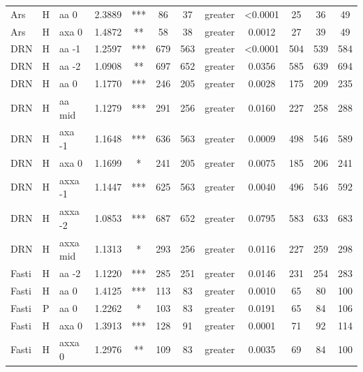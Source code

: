 \documentclass[twocolumn, switch]{article} %
\begin{document}
\begin{table}[h!]
\begin{adjustbox}{totalheight=0.9\textheight}
\begin{tabular}{lclcccclcc@{\hspace{1\tabcolsep}}c@{\hspace{1\tabcolsep}}c}
           Ars &     H &      aa 0 & 2.3889 &     *** &    86 &    37 &  greater &  <0.0001 &       25 &       36 &       49 \\
           Ars &     H &     axa 0 & 1.4872 &      ** &    58 &    38 &  greater &  0.0012 &       27 &       39 &       49 \\
           DRN &     H &     aa -1 & 1.2597 &     *** &   679 &   563 &  greater &  <0.0001 &      504 &      539 &      584 \\
           DRN &     H &     aa -2 & 1.0908 &      ** &   697 &   652 &  greater &  0.0356 &      585 &      639 &      694 \\
           DRN &     H &      aa 0 & 1.1770 &     *** &   246 &   205 &  greater &  0.0028 &      175 &      209 &      235 \\
           DRN &     H &    aa mid & 1.1279 &     *** &   291 &   256 &  greater &  0.0160 &      227 &      258 &      288 \\
           DRN &     H &    axa -1 & 1.1648 &     *** &   636 &   563 &  greater &  0.0009 &      498 &      546 &      589 \\
           DRN &     H &     axa 0 & 1.1699 &       * &   241 &   205 &  greater &  0.0075 &      185 &      206 &      241 \\
           DRN &     H &   axxa -1 & 1.1447 &     *** &   625 &   563 &  greater &  0.0040 &      496 &      546 &      592 \\
           DRN &     H &   axxa -2 & 1.0853 &     *** &   687 &   652 &  greater &  0.0795 &      583 &      633 &      683 \\
           DRN &     H &  axxa mid & 1.1313 &       * &   293 &   256 &  greater &  0.0116 &      227 &      259 &      298 \\
         Fasti &     H &     aa -2 & 1.1220 &     *** &   285 &   251 &  greater &  0.0146 &      231 &      254 &      283 \\
         Fasti &     H &      aa 0 & 1.4125 &     *** &   113 &    83 &  greater &  0.0010 &       65 &       80 &      100 \\
         Fasti &     P &      aa 0 & 1.2262 &       * &   103 &    83 &  greater &  0.0191 &       65 &       84 &      106 \\
         Fasti &     H &     axa 0 & 1.3913 &     *** &   128 &    91 &  greater &  0.0001 &       71 &       92 &      114 \\
         Fasti &     H &    axxa 0 & 1.2976 &      ** &   109 &    83 &  greater &  0.0035 &       69 &       84 &      100 \\

\end{tabular}
\end{adjustbox}
\end{table}
\end{document}
